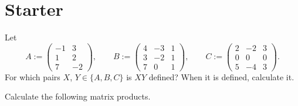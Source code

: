 \documentclass[answers]{exam}
\newcommand*{\bump}{\vspace{1em}\phantom{}\vspace{-1.75em}}
\begin{document}
\section*{Starter}
\begin{questions}

\question%
Let \[
	A:=\begin{pmatrix}-1 & 3 \\ 1 & 2 \\ 7 & -2\end{pmatrix},\qquad
	B:=\begin{pmatrix}4 & -3 & 1 \\ 3 & -2 & 1 \\ 7 & 0 & 1\end{pmatrix},\qquad
	C:=\begin{pmatrix}2 & -2 & 3 \\ 0 & 0 & 0 \\ 5 & -4 & 3\end{pmatrix}.
\] For which pairs $X$, $Y \in\{A, B, C\}$ is $X Y$ defined? When it is defined, calculate it.



\question%
Calculate the following matrix products.
\begin{parts}
\part%
\bump \[
	\begin{pmatrix}
		x & y & z & w
	\end{pmatrix}\begin{pmatrix}
		1 & 0 & 0 & 0 \\
		0 & 1 & 0 & 0 \\
		0 & 0 & 1 & 0 \\
		0 & 0 & 0 & 1
	\end{pmatrix}\begin{pmatrix}
		x \\
		y \\
		z \\
		w
	\end{pmatrix};
\]

\part%
\bump \[
	\begin{pmatrix}
		x & y & z & w
	\end{pmatrix}\begin{pmatrix}
		1 & 0 & 0 & 0 \\
		0 & -1 & 0 & 0 \\
		0 & 0 & -1 & 0 \\
		0 & 0 & 0 & -1
	\end{pmatrix}\begin{pmatrix}
		x \\
		y \\
		z \\
		w
	\end{pmatrix}.
\]
\end{parts}




\end{questions}
\end{document}
